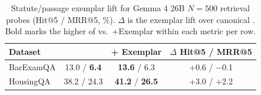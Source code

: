 \begin{table}[t]
\centering
\caption{Statute/passage exemplar lift for Gemma 4 26B $N=500$ retrieval probes (Hit@5 / MRR@5, \%). $\Delta$ is the exemplar lift over canonical \hyre{}. Bold marks the higher of \hyre{} vs.\ +Exemplar within each metric per row.}
\label{tab:exemplar_probe}
\scriptsize
\setlength{\tabcolsep}{2pt}
\begin{tabular}{lccc}
\toprule
Dataset &  \hyre{} & + Exemplar & $\Delta$ Hit@5 / MRR@5 \\
\midrule
BarExamQA  & 13.0 / \textbf{6.4} & \textbf{13.6} / 6.3 & +0.6 / $-$0.1 \\
HousingQA  & 38.2 / 24.3 & \textbf{41.2} / \textbf{26.5} & +3.0 / +2.2 \\
\bottomrule
\end{tabular}
\end{table}
